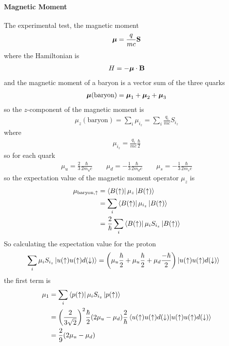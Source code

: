 \documentclass[../main.tex]{subfiles}
\begin{document}
\paragraph*{Magnetic Moment} The experimental test, the magnetic moment
\begin{align*}
    \vb*\mu = \frac{q}{mc} \vb S
\end{align*}
where the Hamiltonian is
\begin{align*}
    H = -\vb*\mu \cdot \vb B
\end{align*}
and the magnetic moment of a baryon is a vector sum of the three quarks
\begin{align*}
    \vb*\mu(\text{baryon}) = \vb*\mu_1 + \vb*\mu_2 + \vb*\mu_3
\end{align*}
so the $z$-component of the magnetic moment is
\begin{align*}
    \mu_z(\text{baryon}) = \sum_i \mu_{i_z} = \sum_i \frac{q_i}{mc} S_{i_z}
\end{align*}
where
\begin{align*}
    \mu_{i_z} = \frac{q_i}{mc} \frac{\hbar}{2}
\end{align*}
so for each quark
\begin{align*}
    \mu_u = \frac{2}{3} \frac{\hbar}{2m_u c} \qquad \mu_d = -\frac{1}{3} \frac{\hbar}{2m_d c} 
    \qquad \mu_s = -\frac{1}{3} \frac{\hbar}{2m_s c}
\end{align*}
so the expectation value of the magnetic moment operator $\mu_z$ is
\begin{align*}
    \mu_{\text{baryon}, \uparrow} &= \bra{B(\uparrow)} \mu_z \ket{B(\uparrow)} \\
    &= \sum_i \bra{B(\uparrow)} \mu_{i_z} \ket{B(\uparrow)} \\
    &= \frac{2}{\hbar} \sum_i \bra{B(\uparrow)} \mu_i S_{i_z} \ket{B(\uparrow)}
\end{align*}
So calculating the expectation value for the proton
\begin{align*}
    \sum_i \mu_i S_{i_z} \ket{u(\ua) u(\ua) d(\da)} &=
         \qt(\mu_u \frac{\hbar}{2} + \mu_u \frac{\hbar}{2} + \mu_d \frac{-\hbar}{2}) 
         \ket{u(\ua) u(\ua) d(\da)}
\end{align*}
the first term is 
\begin{align*}
    \mu_1 &= \sum_i \bra{p(\ua)} \mu_i S_{i_z} \ket{p(\ua)} \\
    &= \qt(\frac{2}{3\sqrt 2})^2 \frac{\hbar}{2} (2\mu_u - \mu_d) \frac{2}{\hbar}
        \bra{u(\ua) u(\ua) d(\da)} \ket{u(\ua) u(\ua) d(\da)} \\
    &= \frac{2}{9} (2\mu_u - \mu_d)
\end{align*}
\end{document}
